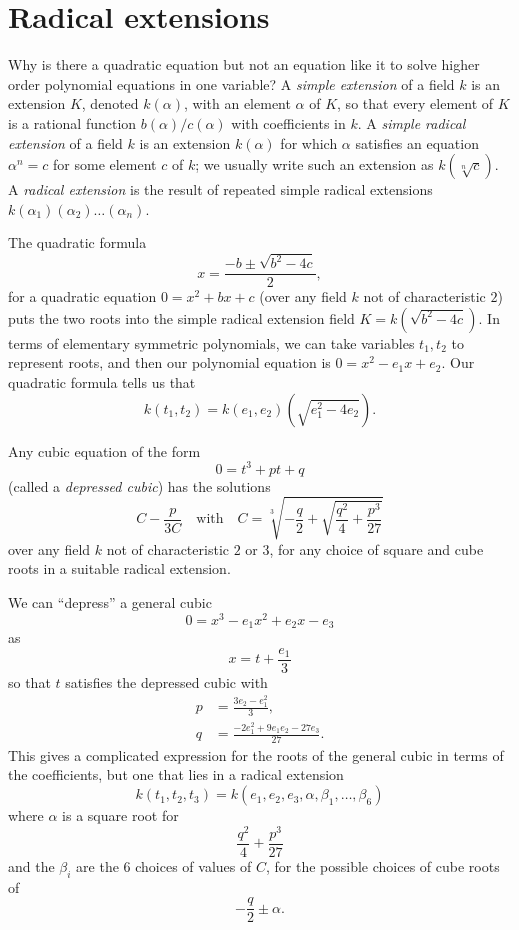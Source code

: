 \section{Radical extensions}
Why is there a quadratic equation but not an equation like it to solve higher order polynomial equations in one variable?
A \emph{simple extension} of a field \(k\) is an extension \(K\), denoted \(k(\alpha)\), with an element \(\alpha\) of \(K\), so that every element of \(K\) is a rational function \(b(\alpha)/c(\alpha)\) with coefficients in \(k\).
A \emph{simple radical extension} of a field \(k\) is an extension \(k(\alpha)\) for which \(\alpha\) satisfies an equation \(\alpha^n=c\) for some element \(c\) of \(k\); we usually write such an extension as \(k(\sqrt[n]{c})\).
A \emph{radical extension} is the result of repeated simple radical extensions \(k(\alpha_1)(\alpha_2)\dots(\alpha_n)\).
\begin{example}
The quadratic formula
\[
x=\frac{-b\pm\sqrt{b^2-4c}}{2},
\]
for a quadratic equation \(0=x^2+bx+c\) (over any field \(k\) not of characteristic \(2\)) puts the two roots into the simple radical extension field \(K=k(\sqrt{b^2-4c})\).
In terms of elementary symmetric polynomials, we can take variables \(t_1,t_2\) to represent roots, and then our polynomial equation is \(0=x^2-e_1x+e_2\).
Our quadratic formula tells us that
\[
k(t_1,t_2)=k(e_1,e_2)(\sqrt{e_1^2-4e_2}).
\]
\end{example}
\begin{example}
Any cubic equation of the form 
\[
0=t^3+pt+q
\]
(called a \emph{depressed cubic}) has the solutions
\[
C-\frac p{3C}\quad\text{with}\quad C=\sqrt[3]{-\frac q2+\sqrt{\frac{q^2}4+\frac{p^3}{27}}}
\]
over any field \(k\) not of characteristic \(2\) or \(3\), for any choice of square and cube roots in a suitable radical extension.
\end{example}
\begin{example}
We can ``depress'' a general cubic
\[
0=x^3-e_1x^2+e_2x-e_3
\]
as
\[
x=t+\frac{e_1}{3}
\]
so that \(t\) satisfies the depressed cubic with
\begin{align*}
p&=\frac{3e_2-e_1^2}{3},\\
q&=\frac{-2e_1^2+9e_1e_2-27e_3}{27}.
\end{align*}
This gives a complicated expression for the roots of the general cubic in terms of the coefficients, but one that lies in a radical extension
\[
k(t_1,t_2,t_3)=
k(e_1,e_2,e_3,\alpha,\beta_1,\dots,\beta_6)
\]
where \(\alpha\) is a square root for 
\[
\frac{q^2}4+\frac{p^3}{27}
\]
and the \(\beta_i\) are the \(6\) choices of values of \(C\), for the possible choices of cube roots of 
\[
-\frac{q}{2}\pm\alpha.
\]
\end{example}
